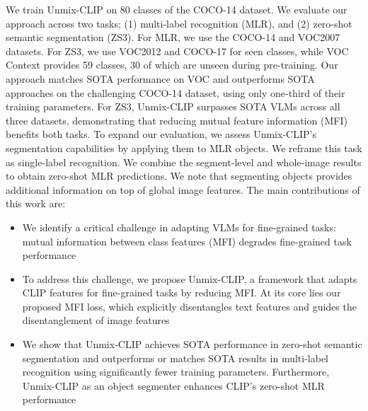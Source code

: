 We train Unmix-CLIP on 80 classes of the COCO-14 \cite{coco} dataset. We evaluate our approach across two tasks: (1) multi-label recognition (MLR), and (2) zero-shot semantic segmentation (ZS3). For MLR, we use the COCO-14  and VOC2007 \cite{pascal-voc} datasets. For ZS3, we use VOC2012 \cite{pascal-voc} and COCO-17 \cite{coco} for seen classes, while VOC Context \cite{context} provides 59 classes, 30 of which are unseen during pre-training. Our approach matches SOTA performance on VOC and outperforms SOTA approaches on the challenging COCO-14 dataset, using only one-third of their training parameters. For ZS3, Unmix-CLIP surpasses SOTA VLMs across all three datasets, demonstrating that reducing mutual feature information (MFI) benefits both tasks. To expand our evaluation, we assess Unmix-CLIP's segmentation capabilities by applying them to MLR objects. We reframe this task as single-label recognition. We combine the segment-level and whole-image results to obtain zero-shot MLR predictions. 
We note that segmenting objects provides additional information on top of global image features.
%
The main contributions of this work are:
\begin{itemize}
    \item We identify a critical challenge in adapting VLMs for fine-grained tasks: mutual information between class features (MFI) degrades fine-grained task performance 
    \item To address this challenge, we propose Unmix-CLIP, a framework that adapts CLIP features for fine-grained tasks by reducing MFI. At its core lies our proposed MFI loss, which explicitly disentangles text features and guides the disentanglement of image features
    \item We show that Unmix-CLIP achieves SOTA performance in zero-shot semantic segmentation and outperforms or matches SOTA results in multi-label recognition using significantly fewer training parameters. Furthermore, Unmix-CLIP as an object segmenter enhances CLIP’s zero-shot MLR performance
\end{itemize}